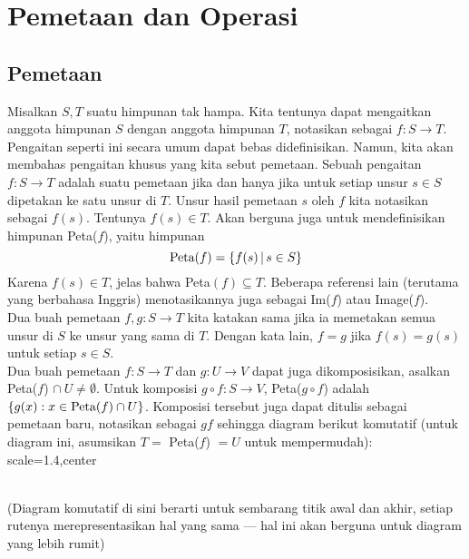 	\section{Pemetaan dan Operasi}
	\subsection{Pemetaan}
	Misalkan $S,T$ suatu himpunan tak hampa. Kita tentunya dapat mengaitkan anggota himpunan $S$ dengan anggota himpunan $T$, notasikan sebagai $f: S \rightarrow T$. Pengaitan seperti ini secara umum dapat bebas didefinisikan. Namun, kita akan membahas pengaitan khusus yang kita sebut pemetaan. Sebuah pengaitan $f: S \rightarrow T$ adalah suatu pemetaan jika dan hanya jika untuk setiap unsur $s \in S$ dipetakan ke satu unsur di $T$. Unsur hasil pemetaan $s$ oleh $f$ kita notasikan sebagai $f(s)$. Tentunya $f(s) \in T$. Akan berguna juga untuk mendefinisikan himpunan Peta($f$), yaitu himpunan
	$$\textnormal{Peta}(f) = \{ f(s) \, | \, s \in S \}$$
	Karena $f(s) \in T$, jelas bahwa Peta$(f) \subseteq T$. Beberapa referensi lain (terutama yang berbahasa Inggris) menotasikannya juga sebagai Im($f$) atau Image($f$).
	\\
	
	Dua buah pemetaan $f,g: S \rightarrow T$ kita katakan sama jika ia memetakan semua unsur di $S$ ke unsur yang sama di $T$. Dengan kata lain, $f = g$ jika $f(s) = g(s)$ untuk setiap $s \in S$.
	\\
	
	Dua buah pemetaan $f: S \rightarrow T$ dan $g: U \rightarrow V$ dapat juga dikomposisikan, asalkan Peta($f$) $ \cap \ U \ne \emptyset$. Untuk komposisi $g \circ f: S \rightarrow V$, Peta($g \circ f$) adalah $\{ g(x) : x \in \textnormal{Peta}(f) \cap U \}$. Komposisi tersebut juga dapat ditulis sebagai pemetaan baru, notasikan sebagai $gf$ sehingga diagram berikut komutatif (untuk diagram ini, asumsikan $T = $ Peta($f$) $ = U$ untuk mempermudah):\\
	\adjustbox
	{scale=1.4,center}{%
	}
	\\
	
	(Diagram komutatif di sini berarti untuk sembarang titik awal dan akhir, setiap rutenya merepresentasikan hal yang sama --- hal ini akan berguna untuk diagram yang lebih rumit)
	\\
	
